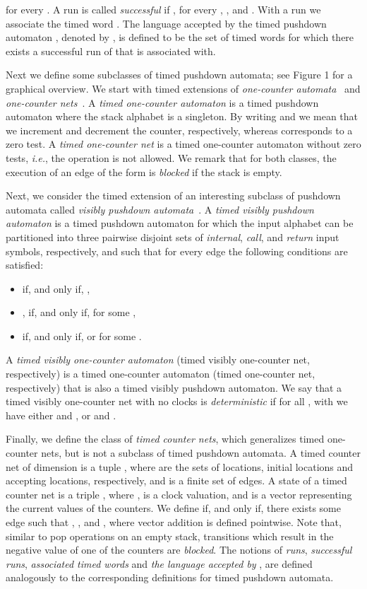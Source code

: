 \documentclass{CSML}
\theoremstyle{plain}\newtheorem{theorem}[thm]{Theorem}
\theoremstyle{plain}\newtheorem{corollary}[thm]{Corollary}
\theoremstyle{plain}\newtheorem{example}[thm]{Example}
\theoremstyle{plain}\newtheorem{lemma}[thm]{Lemma}
\theoremstyle{plain}\newtheorem{remark}[thm]{Remark}
\newcommand*\ie{\textit{i.e.}}
\begin{document}
for every . 
A run is called \emph{successful} if ,  for every , , and .
With a run we associate the timed word . 
The language accepted by the timed pushdown automaton , denoted by , is defined to be the set of timed words  for which there exists a successful run of  that  is associated with.




Next we define some subclasses of timed pushdown automata; see Figure 1 for a graphical overview.
We start with timed extensions of \emph{one-counter automata}~\cite{DLS-tcs10,DBLP:journals/iandc/JancarKMS04} and \emph{one-counter nets}~\cite{DBLP:conf/fsttcs/HofmanLMT13,DBLP:conf/concur/AbdullaC98}. 
A \emph{timed one-counter automaton} is a timed pushdown automaton where the stack alphabet is a singleton. 
By writing  and  we mean that we increment and decrement the counter, respectively, whereas  corresponds to a zero test.  
A \emph{timed one-counter net} is a timed one-counter automaton without zero tests, \ie, the  operation is not allowed.
We remark that for both classes, the execution of an edge of the form  is \emph{blocked} if the stack is empty. 


Next, we consider the timed extension of an interesting subclass of pushdown automata called \emph{visibly pushdown automata}~\cite{DBLP:conf/stoc/AlurM04}. 
A \emph{timed visibly pushdown automaton}
is a timed pushdown automaton for which the input alphabet  can be partitioned into three pairwise disjoint sets  of \emph{internal}, \emph{call}, and \emph{return} input symbols, respectively, and such that
for every edge 
the following conditions are satisfied:
\begin{itemize}
\item  if, and only if,  ,
\item , if, and only if,   for some ,
\item  if, and only if,   or  for some . 	
\end{itemize}
A \emph{timed visibly one-counter automaton} (timed visibly one-counter net, respectively) is a timed one-counter automaton (timed one-counter net, respectively) that is also a timed visibly pushdown automaton.
We say that a timed visibly one-counter net with no clocks is \emph{deterministic} if 
for all ,   with  we  have either  and , or
 and . 

Finally, we define the class of \emph{timed counter nets}, which generalizes timed one-counter nets, but is not a subclass of timed pushdown automata. 
A timed counter net of dimension  is a tuple 
, where 
 are the sets of locations, initial locations and accepting locations, respectively, and 
 is a finite set of edges. 
A state of a timed counter net is a triple , where ,  is a clock valuation, and  is a vector representing the current values of the counters. We define  if, and only if, there exists some edge  such that , , and , where  vector addition is defined pointwise.  Note that, similar to pop operations on an empty stack, transitions which result in the negative value of one of the counters are \emph{blocked}. 
The notions of \emph{runs}, \emph{successful runs}, \emph{associated timed words} and \emph{the language accepted by }, are defined analogously to the corresponding definitions for timed pushdown automata. 
\end{document}
